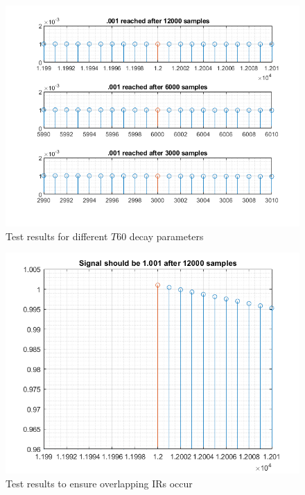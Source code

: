 \documentclass[../main.tex]{subfiles}
\begin{document}
\begin{figure}[h]
    \centering
    \includegraphics[scale=.65]{./images/plots/ExpDecayTest1.png}
    \caption{Test results for different $T60$ decay parameters}
    \label{fig:ExpDecayTest1}
\end{figure}

\begin{figure}[h]
    \centering
    \includegraphics[scale=.65]{./images/plots/ExpDecayTest2.png}
    \caption{Test results to ensure overlapping IRs occur}
    \label{fig:ExpDecayTest2}
\end{figure}

\clearpage
\end{document}
